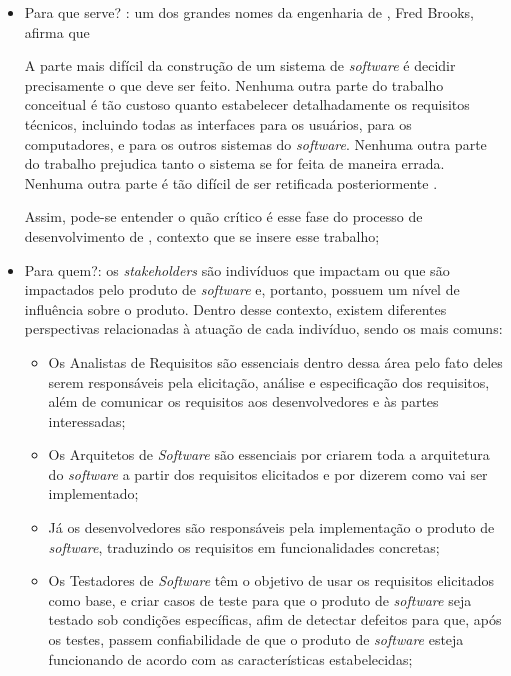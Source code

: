 \begin{itemize}
    \item Para que serve? : um dos grandes nomes da engenharia de , Fred Brooks, afirma que
        \begin{citacao}
        A parte mais difícil da construção de um sistema de \textit{software} é decidir precisamente o que deve ser feito. Nenhuma outra parte do trabalho conceitual é tão  custoso quanto estabelecer detalhadamente os requisitos técnicos, incluindo todas as interfaces para os usuários, para os computadores, e para os outros sistemas do \textit{software}. Nenhuma outra parte do trabalho prejudica tanto o sistema se for feita de maneira errada. Nenhuma outra parte é tão difícil de ser retificada posteriormente \cite[p.~199]{brooks1995mythical}.
        \end{citacao}
    Assim, pode-se entender o quão crítico é esse fase do processo de desenvolvimento de , contexto que se insere esse trabalho;
    
    \item Para quem?: os \textit{stakeholders} são indivíduos que impactam ou que são impactados pelo produto de \textit{software} e, portanto, possuem um nível de influência sobre o produto. Dentro desse contexto, existem diferentes perspectivas relacionadas à atuação de cada indivíduo, sendo os mais comuns:
    
    \begin{itemize}
        \item Os Analistas de Requisitos são essenciais dentro dessa área pelo fato deles serem responsáveis pela elicitação, análise e especificação dos requisitos, além de comunicar os requisitos aos desenvolvedores e às partes interessadas;
    
        \item Os Arquitetos de \textit{Software} são essenciais por criarem toda a arquitetura do \textit{software} a partir dos requisitos elicitados e por dizerem como vai ser implementado;
    
        \item Já os desenvolvedores são responsáveis pela implementação o produto de \textit{software}, traduzindo os requisitos em funcionalidades concretas;
    
        \item Os Testadores de \textit{Software} têm o objetivo de usar os requisitos elicitados como base, e criar casos de teste para que o produto de \textit{software} seja testado sob condições específicas, afim de detectar defeitos para que, após os testes, passem confiabilidade de que o produto de \textit{software} esteja funcionando de acordo com as características estabelecidas;
    

\end{itemize}
\end{itemize}
